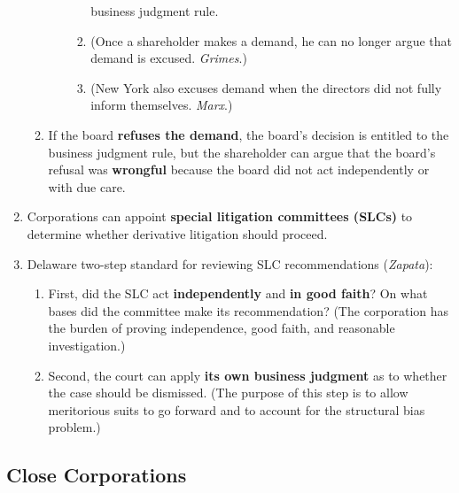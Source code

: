 \begin{enumerate}
\begin{enumerate}
\begin{enumerate}
\begin{enumerate}
                business judgment rule.
                \item (Once a shareholder makes a demand, he can no longer 
                argue that demand is excused. \emph{Grimes}.)
                \item (New York also excuses demand when the directors did not 
                fully inform themselves. \emph{Marx}.)
            \end{enumerate}
        \end{enumerate}
        \item If the board \textbf{refuses the demand}, the board's decision 
        is entitled to the business judgment rule, but the shareholder can 
        argue that the board's refusal was \textbf{wrongful} because the board 
        did not act independently or with due care.
    \end{enumerate}
    \item Corporations can appoint \textbf{special litigation committees 
    (SLCs)} to determine whether derivative litigation should proceed.
    \item Delaware two-step standard for reviewing SLC recommendations 
    (\emph{Zapata}):
    \begin{enumerate}
        \item First, did the SLC act \textbf{independently} and \textbf{in 
        good faith}? On what bases did the committee make its recommendation? 
        (The corporation has the burden of proving independence, good faith, 
        and reasonable investigation.)
        \item Second, the court can apply \textbf{its own business judgment} 
        as to whether the case should be dismissed. (The purpose of this step 
        is to allow meritorious suits to go forward and to account for the 
        structural bias problem.)
    \end{enumerate}
\end{enumerate}



\newpage

\subsection{Close Corporations}


